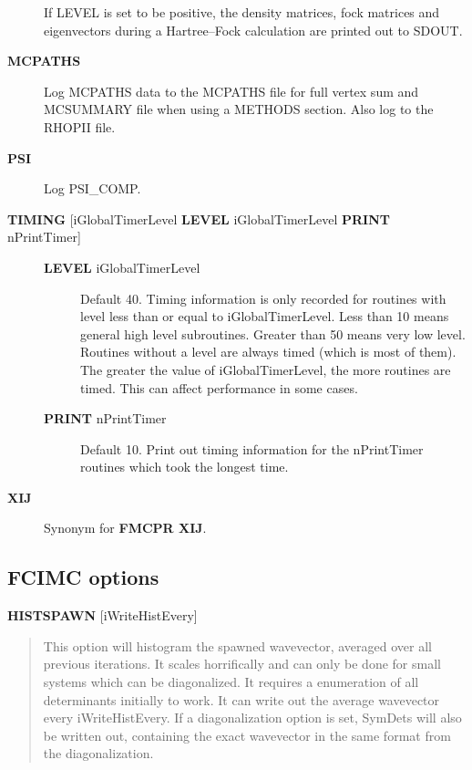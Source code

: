 \documentclass[openany,a4paper,10pt,english]{manual}
\begin{document}
\begin{description}
If LEVEL is set to be positive, the density matrices, fock matrices and
eigenvectors during a Hartree--Fock calculation are printed out to SDOUT.

\item[\textbf{MCPATHS}] \leavevmode
Log MCPATHS data to the MCPATHS file for full vertex sum and MCSUMMARY
file when using a METHODS section.  Also log to the RHOPII file.

\item[\textbf{PSI}] \leavevmode
Log PSI\_COMP.

\item[\textbf{TIMING} {[}iGlobalTimerLevel \textbar{} \textbf{LEVEL} iGlobalTimerLevel \textbar{} \textbf{PRINT} nPrintTimer{]}] \leavevmode\begin{description}
\item[\textbf{LEVEL} iGlobalTimerLevel] \leavevmode
Default 40.
Timing information is only recorded for routines with level less than
or equal to iGlobalTimerLevel.  Less than 10 means general high level
subroutines. Greater than 50 means very low level.  Routines without
a level are always timed (which is most of them).  The greater the value
of iGlobalTimerLevel, the more routines are timed.  This can affect
performance in some cases.

\item[\textbf{PRINT} nPrintTimer] \leavevmode
Default 10.
Print out timing information for the nPrintTimer routines which took the longest time.

\end{description}

\item[\textbf{XIJ}] \leavevmode
Synonym for \textbf{FMCPR XIJ}.

\end{description}


\subsection{FCIMC options}

\textbf{HISTSPAWN} {[}iWriteHistEvery{]}
\begin{quote}

This option will histogram the spawned wavevector, averaged over all previous iterations.
It scales horrifically and can only be done for small systems which can be diagonalized.
It requires a enumeration of all determinants initially to work. It can write out the
average wavevector every iWriteHistEvery.
If a diagonalization option is set, SymDets will also be written out, containing the exact
wavevector in the same format from the diagonalization.
\end{quote}
\end{document}
